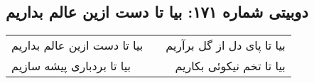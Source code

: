\begin{center}
\section*{دوبیتی شماره ۱۷۱: بیا تا دست ازین عالم بداریم}
\label{sec:171}
\begin{longtable}{l p{0.5cm} r}
بیا تا دست ازین عالم بداریم
&&
بیا تا پای دل از گل برآریم
\\
بیا تا بردباری پیشه سازیم
&&
بیا تا تخم نیکوئی بکاریم
\\
\end{longtable}
\end{center}
